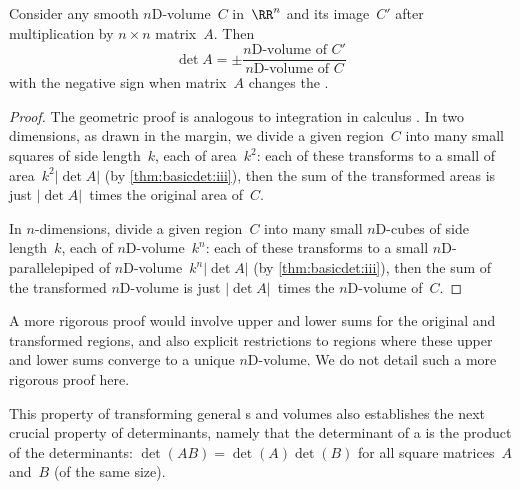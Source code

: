 \begin{theorem} \label{thm:detanyC} 
Consider any  smooth $n$D-volume~\(C\) in~\(\RR^n\) and its image~\(C'\) after multiplication by \(n\times n\) matrix~\(A\).
Then
\begin{equation*}
\det A=\pm\frac{\text{$n$D-volume of }C'}
{\text{$n$D-volume of }C}
\end{equation*}
with the negative sign when matrix~\(A\) changes the .
\end{theorem}
\begin{proof} 
The geometric proof is analogous to integration in calculus \cite[p.402]{Hannah96}. 
In two dimensions, as drawn in the margin,  we divide a given region~\(C\) into  many small squares of side length~\(k\), each of area~\(k^2\):  each of these transforms to a small  of area~\(k^2|\det A|\) (by \cref{thm:basicdet:iii}), then the sum of the transformed areas is just \(|\det A|\)~times the  original area of~\(C\).

In  \(n\)-dimensions, divide a given region~\(C\) into  many small $n$D-cubes of side length~\(k\), each of $n$D-volume~\(k^n\):  each of these transforms to a small $n$D-parallelepiped of $n$D-volume~\(k^n|\det A|\) (by \cref{thm:basicdet:iii}), then the sum of the transformed $n$D-volume is just \(|\det A|\)~times the  $n$D-volume of~\(C\). 
\end{proof}

A more rigorous proof would involve upper and lower sums for the original and transformed regions, and also explicit restrictions to regions where these upper and lower sums converge to a unique $n$D-volume. 
We do not detail such a more rigorous proof here.


This property of transforming general s and volumes also establishes the next crucial property of determinants, namely that the determinant of a  is the product of the determinants: \(\det(AB)=\det(A)\det(B)\) for all square matrices~\(A\) and~\(B\) (of the same size).

